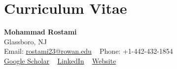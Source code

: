 %
%

\chapter*{Curriculum Vitae}

\newcommand{\resumeSubheading}[4]{
  \vspace{-2pt}\item
    \begin{tabular*}{1.0\textwidth}[t]{l@{\extracolsep{\fill}}r}
      \textbf{#1} & \textbf{\small #2} \\
      \textit{\small#3} & \textit{\small #4} \\
    \end{tabular*}\vspace{-7pt}
}

\newcommand{\resumeItem}[1]{
  \item\small{
    {#1 \vspace{-2pt}}
  }
}

\newcommand{\resumeSubHeadingListStart}{\begin{itemize}[leftmargin=0.0in, label={}]}
\newcommand{\resumeSubHeadingListEnd}{\end{itemize}}
\newcommand{\resumeItemListStart}{\begin{itemize}}
\newcommand{\resumeItemListEnd}{\end{itemize}\vspace{-5pt}}

\begin{center}
    {\Large \textbf{Mohammad Rostami}} \\ \vspace{1pt}
    Glassboro, NJ \\
    Email: \href{mailto:rostami23@rowan.edu}{rostami23@rowan.edu} ~
    Phone: +1-442-432-1854 \\
    \href{https://scholar.google.com/citations?hl=en&user=Md81vrUAAAAJ}{Google Scholar} ~
    \href{https://linkedin.com/in/woreom}{LinkedIn} ~
    \href{https://www.woreom.com/}{Website}
\end{center}


